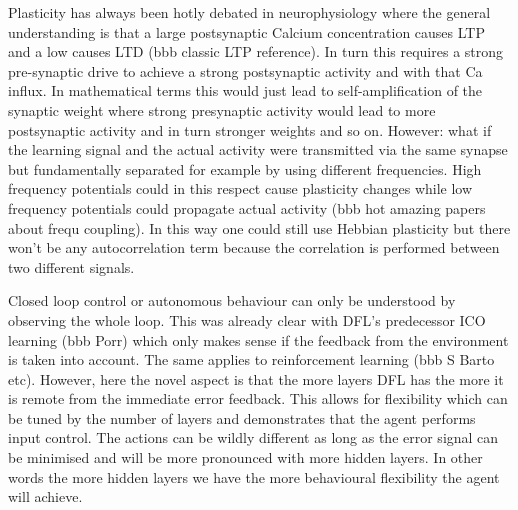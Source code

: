 \documentclass{llncs}
\begin{document}
Plasticity has always been hotly debated in neurophysiology where the
general understanding is that a large postsynaptic Calcium
concentration causes LTP and a low causes LTD (bbb classic LTP
reference). In turn this requires a strong pre-synaptic drive to
achieve a strong postsynaptic activity and with that Ca influx.  In
mathematical terms this would just lead to self-amplification of the
synaptic weight where strong presynaptic activity would lead to more
postsynaptic activity and in turn stronger weights and so on. However:
what if the learning signal and the actual activity were transmitted
via the same synapse but fundamentally separated for example by using
different frequencies. High frequency potentials could in this respect
cause plasticity changes while low frequency potentials could
propagate actual activity (bbb hot amazing papers about frequ
coupling). In this way one could still use Hebbian plasticity but
there won't be any autocorrelation term because the correlation is
performed between two different signals.

Closed loop control or autonomous behaviour can only be understood by
observing the whole loop. This was already clear with DFL's
predecessor ICO learning (bbb Porr) which only makes sense if the
feedback from the environment is taken into account. The same applies
to reinforcement learning (bbb S Barto etc). However, here the
novel aspect is that the more layers DFL has the more it is
remote from the immediate error feedback. This allows for
flexibility which can be tuned by the number of layers and demonstrates
that the agent performs input control. The actions can be wildly
different as long as the error signal can be minimised and will
be more pronounced with more hidden layers. In other words
the more hidden layers we have the more behavioural flexibility
the agent will achieve.







\end{document}
